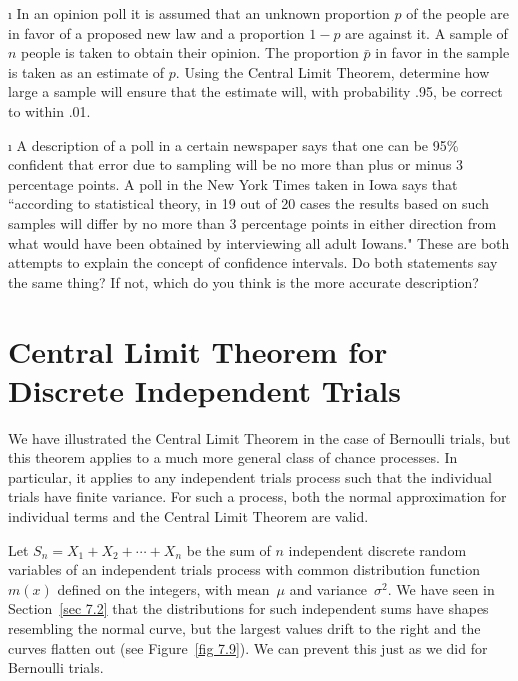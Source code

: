 \begin{LJSItem}
\i\label{exer 9.1.17}  In an opinion poll it is assumed that an unknown proportion $p$
of the people are in favor of a proposed new law and a proportion $1-p$ are against
it.  A sample of $n$ people is taken to obtain their opinion.  The proportion ${\bar
p}$ in favor in the sample is taken as an estimate of $p$.  Using the Central Limit
Theorem, determine how large a sample will ensure that the estimate will, with
probability .95, be correct to within .01.

\i\label{exer 9.1.18} 
A description of a poll in a certain newspaper says that one can be 
95\% confident that error due to sampling will be no more 
than plus or minus 3 percentage points.  A poll in the 
New York Times taken in Iowa says that ``according to statistical 
theory, in 19 out of 20 cases the results based on such samples will 
differ by no more than 3 percentage points in either 
direction from what would have been obtained by 
interviewing all adult Iowans." These are both attempts 
to explain the concept of confidence intervals.  Do both statements
say the same thing?  If not, which do you think is 
the more accurate description? 

\end{LJSItem}

\section[Discrete Independent Trials]{\bf Central Limit Theorem for Discrete Independent Trials}\label{sec 9.3}
We have illustrated the Central Limit Theorem in the case of Bernoulli trials, but
this theorem applies to a much more general class of chance processes.  In
particular, it applies to any independent trials process such that the individual trials have
finite variance.  For such a process, both the normal approximation for individual terms and the
Central Limit Theorem are valid.

Let $S_n = X_1 + X_2 +\cdots+ X_n$ be the sum of $n$ independent discrete random
variables of an independent trials process with common distribution function $m(x)$ defined on
the integers, with mean~$\mu$ and variance~$\sigma^2$.  {We have seen in
Section~\ref{sec 7.2} that the distributions for such independent sums have shapes
resembling the normal curve, but the largest values drift to the right and the
curves flatten out (see Figure~\ref{fig 7.9}).}  We can prevent
this just as we did for Bernoulli trials.

